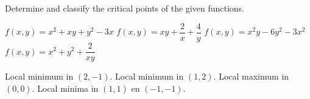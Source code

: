 \subsection*{}


\ifcalculus
\begin{Exercise} Determine and classify the critical points of the given functions.
\begin{multicols}{2}
\Question[difficulty=1] $f(x,y) = x^2+xy+y^2-3x$
\Question[difficulty=2] $f(x,y) = xy+\dfrac{2}{x}+\dfrac{4}{y}$
\Question[difficulty=2] $f(x,y) = x^2y-6y^2-3x^2$
\Question[difficulty=2] $f(x,y) = x^2+y^2+\dfrac{2}{xy}$
\EndCurrentQuestion
\end{multicols}
\end{Exercise}

\begin{Answer}
    
    \Question Local minimum in $(2,-1)$.  
    \Question Local minimum in $(1,2)$. 
    \Question Local maximum in $(0,0)$. 
    \Question Local minima in $(1,1)$ en $(-1,-1)$. 
    
\end{Answer}
\fi



